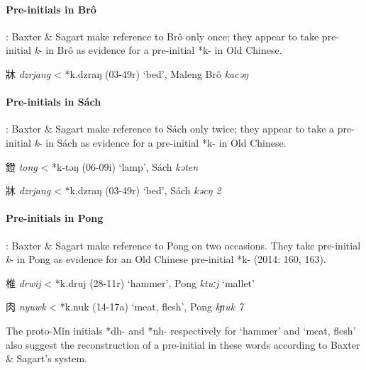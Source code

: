 \paragraph{Pre-initials in Brô}: Baxter \&
Sagart make reference to Brô only once; they appear to take pre-initial
 \emph{k}- in Brô as evidence for a pre-initial *k- in Old Chinese.

\begin{description} \item
牀  \emph{dzrjang} \textless{} *k.dzraŋ (03-49r) `bed', Maleng Brô
 \emph{kac{}əŋ}
\end{description}

\paragraph{Pre-initials in Sách}: Baxter \&
Sagart make reference to Sách only twice; they appear to take a
pre-initial \emph{k}- in Sách as evidence for a pre-initial *k- in Old
Chinese.

\begin{description} \item
鐙  \emph{tong} \textless{} *k-t{}əŋ (06-09i) `lamp', Sách \emph{kəten}

\item
牀  \emph{dzrjang} \textless{} *k.dzraŋ (03-49r) `bed', Sách \emph{kəc{}ŋ
2}
\end{description}

\paragraph{Pre-initials in Pong}: Baxter \&
Sagart make reference to Pong on two occasions. They take pre-initial
 \emph{k}- in Pong as evidence for an Old Chinese pre-initial *k- (2014:
160, 163).

\begin{description} \item
椎  \emph{drwij} \textless{} *k.druj (28-11r) `hammer', Pong \emph{ktuːj}
`mallet'

\item
肉  \emph{nyuwk} \textless{} *k.nuk (14-17a) `meat, flesh', Pong
 \emph{kɲuk 7}
\end{description}

The proto-Mǐn initials *dh- and *nh- respectively for `hammer' and
`meat, flesh' also suggest the reconstruction of a pre-initial in these
words according to Baxter \& Sagart's system.

